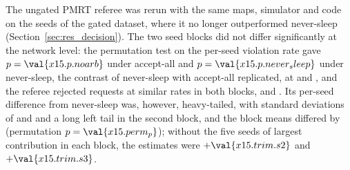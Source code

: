 The ungated PMRT referee was rerun with the same maps, simulator and code on the seeds of the gated dataset, where it no
longer outperformed never-sleep (Section~\ref{sec:res_decision}). The two seed blocks did not differ significantly at
the network level: the permutation test on the per-seed violation rate gave $p = \val{x15.p.noarb}$ under accept-all and $p = \val{x15.p.never_sleep}$
under never-sleep, the contrast of never-sleep with accept-all replicated, at  and , and the referee rejected
requests at similar rates in both blocks,  and . Its per-seed difference from never-sleep was, however,
heavy-tailed, with standard deviations of  and  and a long left tail in the second block, and the block means
differed by  (permutation $p = \val{x15.perm_p}$); without the five seeds of largest contribution in each block, the estimates
were $+\val{x15.trim.s2}$ and $+\val{x15.trim.s3}$.
